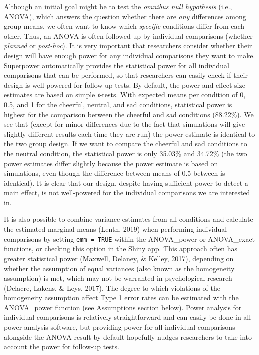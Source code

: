 \documentclass[
  english,
  ,jou,floatsintext]{apa6}
\begin{document}
Although an initial goal might be to test the \emph{omnibus null hypothesis} (i.e., ANOVA), which answers the question whether there are \emph{any} differences among group means, we often want to know which \emph{specific} conditions differ from each other.
Thus, an ANOVA is often followed up by individual comparisons (whether \emph{planned} or \emph{post-hoc}).
It is very important that researchers consider whether their design will have enough power for any individual comparisons they want to make.
Superpower automatically provides the statistical power for all individual comparisons that can be performed, so that researchers can easily check if their design is well-powered for follow-up tests.
By default, the power and effect size estimates are based on simple \emph{t}-tests.
With expected means per condition of 0, 0.5, and 1 for the cheerful, neutral, and sad conditions, statistical power is highest for the comparison between the cheerful and sad conditions (88.22\%).
We see that (except for minor differences due to the fact that simulations will give slightly different results each time they are run) the power estimate is identical to the two group design.
If we want to compare the cheerful and sad conditions to the neutral condition, the statistical power is only 35.03\% and 34.72\% (the two power estimates differ slightly because the power estimate is based on simulations, even though the difference between means of 0.5 between is identical).
It is clear that our design, despite having sufficient power to detect a main effect, is not well-powered for the individual comparisons we are interested in.

It is also possible to combine variance estimates from all conditions and calculate the estimated marginal means (Lenth, 2019) when performing individual comparisons by setting \texttt{emm\ =\ TRUE} within the ANOVA\_power or ANOVA\_exact functions, or checking this option in the Shiny app.
This approach often has greater statistical power (Maxwell, Delaney, \& Kelley, 2017), depending on whether the assumption of equal variances (also known as the homogeneity assumption) is met, which may not be warranted in psychological research (Delacre, Lakens, \& Leys, 2017).
The degree to which violations of the homogeneity assumption affect Type 1 error rates can be estimated with the ANOVA\_power function (see Assumptions section below).
Power analysis for individual comparisons is relatively straightforward and can easily be done in all power analysis software, but providing power for all individual comparisons alongside the ANOVA result by default hopefully nudges researchers to take into account the power for follow-up tests.
\end{document}
